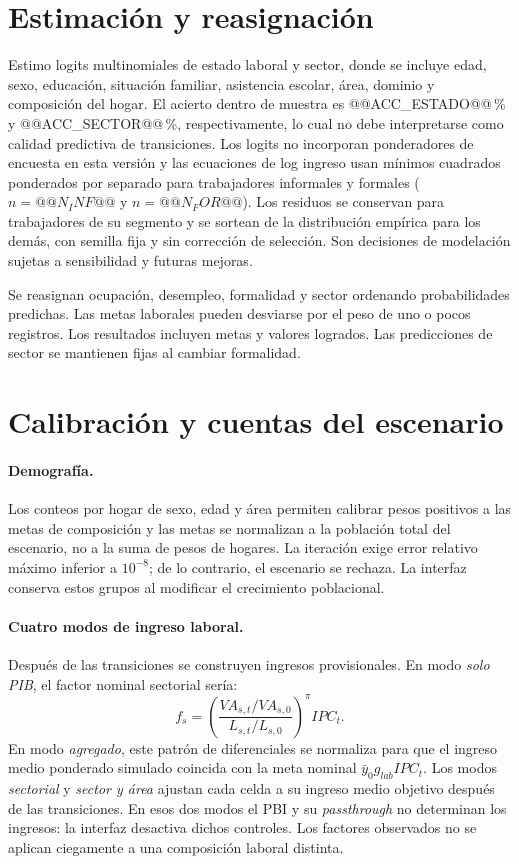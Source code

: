 \documentclass[11pt,a4paper]{article}
\begin{document}
\section{Estimación y reasignación}
Estimo logits multinomiales de estado laboral y sector, donde se incluye edad, sexo, educación, situación familiar, asistencia escolar, área, dominio y composición del hogar. El acierto dentro de muestra es @@ACC_ESTADO@@\,\% y @@ACC_SECTOR@@\,\%, respectivamente, lo cual no debe interpretarse como calidad predictiva de transiciones. Los logits no incorporan ponderadores de encuesta en esta versión y las ecuaciones de log ingreso usan mínimos cuadrados ponderados por separado para trabajadores informales y formales (\(n=@@N_INF@@\) y \(n=@@N_FOR@@\)). Los residuos se conservan para trabajadores de su segmento y se sortean de la distribución empírica para los demás, con semilla fija y sin corrección de selección. Son decisiones de modelación sujetas a sensibilidad y futuras mejoras.

Se reasignan ocupación, desempleo, formalidad y sector ordenando probabilidades predichas. Las metas laborales pueden desviarse por el peso de uno o pocos registros. Los resultados incluyen metas y valores logrados. Las predicciones de sector se mantienen fijas al cambiar formalidad.

\section{Calibración y cuentas del escenario}
\paragraph{Demografía.} Los conteos por hogar de sexo, edad y área permiten calibrar pesos positivos a las metas de composición y las metas se normalizan a la población total del escenario, no a la suma de pesos de hogares. La iteración exige error relativo máximo inferior a \(10^{-8}\); de lo contrario, el escenario se rechaza. La interfaz conserva estos grupos al modificar el crecimiento poblacional.

\paragraph{Cuatro modos de ingreso laboral.} Después de las transiciones se construyen ingresos provisionales. En modo \emph{solo PIB}, el factor nominal sectorial sería:
\[
f_s=\left(\frac{VA_{s,t}/VA_{s,0}}{L_{s,t}/L_{s,0}}\right)^{\pi} IPC_t.
\]
En modo \emph{agregado}, este patrón de diferenciales se normaliza para que el ingreso medio ponderado simulado coincida con la meta nominal \(\bar y_0 g_{lab}IPC_t\). Los modos \emph{sectorial} y \emph{sector y área} ajustan cada celda a su ingreso medio objetivo después de las transiciones. En esos dos modos el PBI y su \emph{passthrough} no determinan los ingresos: la interfaz desactiva dichos controles. Los factores observados no se aplican ciegamente a una composición laboral distinta.
\end{document}
